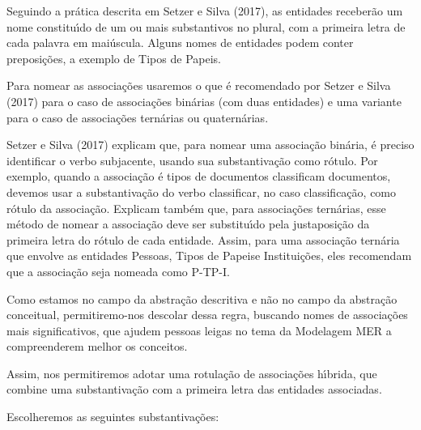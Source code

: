 \documentclass[
12pt,		%
openright,	%
twoside,  %
a4paper,			%
chapter=TITLE,		%
english,			%
french,				%
spanish,			%
brazil				%
]{USPSC-classe/USPSC}
\begin{document}
Seguindo a pr\'atica descrita em  Setzer e Silva (2017), as entidades receber\~ao um nome constitu\'{\i}do de um ou mais substantivos no plural, com a primeira letra de cada palavra em mai\'uscula. Alguns nomes de entidades podem conter preposi\c{c}\~oes, a exemplo de \textquotedbl Tipos de Papeis\textquotedbl .




Para nomear as associa\c{c}\~oes usaremos o que \'e recomendado por Setzer e Silva (2017) para o caso de associa\c{c}\~oes bin\'arias (com duas entidades) e uma variante para o caso de associa\c{c}\~oes tern\'arias ou quatern\'arias.




 Setzer e Silva (2017) explicam que, para nomear uma associa\c{c}\~ao bin\'aria, \'e preciso identificar o verbo subjacente, usando sua substantiva\c{c}\~ao como r\'otulo. Por exemplo, quando a associa\c{c}\~ao \'e \textquotedbl tipos de documentos classificam documentos\textquotedbl , devemos usar a substantiva\c{c}\~ao do verbo \textquotedbl classificar\textquotedbl , no caso \textquotedbl classifica\c{c}\~ao\textquotedbl , como r\'otulo da associa\c{c}\~ao. Explicam tamb\'em que, para associa\c{c}\~oes tern\'arias, esse m\'etodo de nomear a associa\c{c}\~ao deve ser substitu\'{\i}do pela justaposi\c{c}\~ao da primeira letra do r\'otulo de cada entidade. Assim, para uma associa\c{c}\~ao tern\'aria que envolve as entidades \textquotedbl Pessoas\textquotedbl , \textquotedbl Tipos de Papeis\textquotedbl  e \textquotedbl Institui\c{c}\~oes\textquotedbl , eles recomendam que a associa\c{c}\~ao seja nomeada como \textquotedbl P-TP-I\textquotedbl .




Como estamos no campo da abstra\c{c}\~ao descritiva e n\~ao no campo da abstra\c{c}\~ao conceitual, permitiremo-nos descolar dessa regra, buscando nomes de associa\c{c}\~oes mais significativos, que ajudem pessoas leigas no tema da Modelagem MER a compreenderem melhor os conceitos.




Assim, nos permitiremos adotar uma rotula\c{c}\~ao de associa\c{c}\~oes h\'{\i}brida, que combine uma substantiva\c{c}\~ao com a primeira letra das entidades associadas.




Escolheremos as seguintes substantiva\c{c}\~oes:
\end{document}

